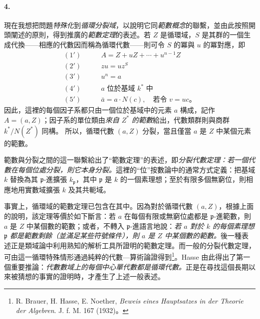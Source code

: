 \documentclass[11pt]{article}
\begin{document}
\paragraph{4.}
現在我想把問題\emph{特殊化}到\emph{循環分裂域}，以說明它同\emph{範數概念}的聯繫，並由此按照開頭闡述的原則，得到推廣的\emph{範數定理}的表述。若 \(Z\) 是循環域，\(S\) 是其群的一個生成代換——相應的代數因而稱為循環代數——則可令 \(S\) 的冪與 \(u\) 的冪對應，即
\[
\begin{aligned}
(1')\qquad &A=Z+uZ+\cdots+u^{n-1}Z\\
(2')\qquad &zu=uz^S\\
(3')\quad &u^n=a\\
(4')\quad &a\text{ 位於基域 }k^\ast\text{ 中}\\
(5')\quad &\bar a=a\cdot N(c),\quad \text{若令 }v=uc\text{。}
\end{aligned}
\]
因此，這裡的每個因子系都只由一個位於基域中的元素 \(a\) 構成，記作 \(A=(a,Z)\)；因子系的單位類由\emph{來自 \(Z^\ast\) 的範數}給出，代數類群則與商群 \(k^\ast/N(Z^\ast)\) 同構。
所以，循環代數 \((a,Z)\) 分裂，當且僅當 \(a\) 是 \(Z\) 中某個元素的範數。

範數與分裂之間的這一聯繫給出了“範數定理”的表述，即\emph{分裂代數定理：若一個代數在每個位處分裂，則它本身分裂。}這裡的“位”按數論中的通常方式定義：把基域 \(k\) 替換為其 \(\mathfrak p\)-進擴張 \(k_{\mathfrak p}\)，其中 \(\mathfrak p\) 是 \(k\) 的一個素理想；至於有限多個無窮位，則相應地用實數域擴張 \(k\) 及其共軛域。

事實上，循環域的範數定理已包含在其中。因為對於循環代數 \((a,Z)\)，根據上面的說明，該定理等價於如下斷言：若 \(a\) 在每個有限或無窮位處都是 \(\mathfrak p\)-進範數，則 \(a\) 是 \(Z\) 中某個數的範數；或者，不轉入 \(\mathfrak p\)-進語言地說：\emph{若 \(a\) 對於 \(k\) 的每個素理想 \(\mathfrak p\) 都是範數剩餘（並滿足某些符號條件），則 \(a\) 是 \(Z\) 中某個數的範數。}後一種表述正是類域論中利用熟知的解析工具所證明的範數定理。而一般的分裂代數定理，可由這一循環特殊情形通過純粹的代數—算術論證得到\footnote{R. Brauer, H. Hasse, E. Noether, \emph{Beweis eines Hauptsatzes in der Theorie der Algebren}. J. f. M. 167 (1932)。}。Hasse 由此得出了第一個重要推論：\emph{代數數域上的每個中心單代數都是循環代數。}正是在尋找這個長期以來被猜想的事實的證明時，才產生了上述一般表述。
\end{document}
